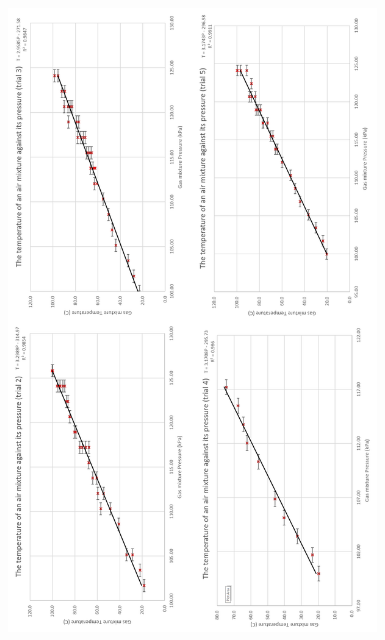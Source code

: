 \documentclass[a4paper,12pt]{article}
\begin{document}
\begin{figure}[H]
    \centering
    \includegraphics[width=0.87\textwidth]{assets/graphs.png}
    \label{fig:dg25}
\end{figure}
\end{document}
